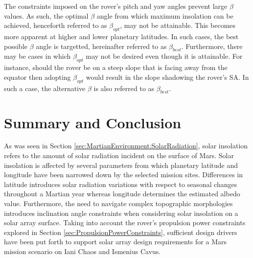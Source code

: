The constraints imposed on the rover's pitch and yaw angles prevent large $\beta$ values. As such, the optimal $\beta$ angle from which maximum insolation can be achieved, henceforth referred to as $\beta_{opt}$, may not be attainable. This becomes more apparent at higher and lower planetary latitudes. In such cases, the best possible $\beta$ angle is targetted, hereinafter referred to as $\beta_{best}$. Furthermore, there may be cases in which $\beta_{opt}$ may not be desired even though it is attainable. For instance, should the rover be on a steep slope that is facing away from the equator then adopting $\beta_{opt}$ would result in the slope shadowing the rover's \ac{SA}. In such a case, the alternative $\beta$ is also referred to as $\beta_{best}$.

\section{Summary and Conclusion}
As was seen in Section \ref{sec:MartianEnvironment:SolarRadiation}, solar insolation refers to the amount of solar radiation incident on the surface of Mars. Solar insolation is affected by several parameters from which planetary latitude and longitude have been narrowed down by the selected mission sites. Differences in latitude introduces solar radiation variations with respect to seasonal changes throughout a Martian year whereas longitude determines the estimated albedo value. Furthermore, the need to navigate complex topographic morphologies introduces inclination angle constraints when considering solar insolation on a solar array surface. Taking into account the rover's propulsion power constraints explored in Section \ref{sec:PropulsionPowerConstraints}, sufficient design drivers have been put forth to support solar array design requirements for a Mars mission scenario on Iani Chaos and Ismenius Cavus.
